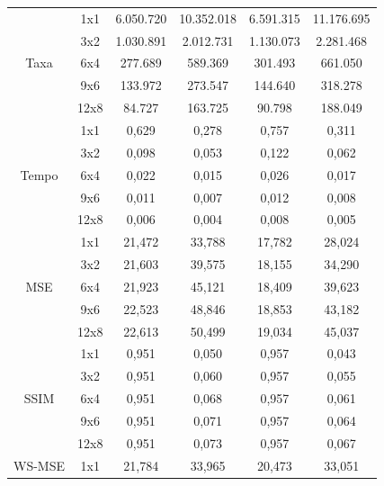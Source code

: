 \begin{longtable}{|c|c|c|c|c|c|}
        \multirow{5}{*}{Taxa}  & 1x1  & 6.050.720 & 10.352.018 & 6.591.315 & 11.176.695 \\ \cline{2-6}
        & 3x2  & 1.030.891 & 2.012.731  & 1.130.073 & 2.281.468 \\ \cline{2-6}
        & 6x4  & 277.689   & 589.369    & 301.493   & 661.050  \\  \cline{2-6}
        & 9x6  & 133.972   & 273.547    & 144.640   & 318.278  \\  \cline{2-6}
        & 12x8 & 84.727    & 163.725    & 90.798    & 188.049  \\   \hline
        \multirow{5}{*}{Tempo} & 1x1  & 0,629     & 0,278      & 0,757     & 0,311     \\  \cline{2-6}
        & 3x2  & 0,098     & 0,053      & 0,122     & 0,062    \\  \cline{2-6}
        & 6x4  & 0,022     & 0,015      & 0,026     & 0,017    \\  \cline{2-6}
        & 9x6  & 0,011     & 0,007      & 0,012     & 0,008    \\  \cline{2-6}
        & 12x8 & 0,006     & 0,004      & 0,008     & 0,005    \\  \hline 
        \multirow{5}{*}{MSE}   & 1x1  & 21,472    & 33,788     & 17,782    & 28,024    \\  \cline{2-6}          
        & 3x2  & 21,603    & 39,575     & 18,155    & 34,290   \\  \cline{2-6}
        & 6x4  & 21,923    & 45,121     & 18,409    & 39,623   \\  \cline{2-6}
        & 9x6  & 22,523    & 48,846     & 18,853    & 43,182   \\  \cline{2-6}
        & 12x8 & 22,613    & 50,499     & 19,034    & 45,037   \\  \hline 
        \multirow{5}{*}{SSIM}  & 1x1  & 0,951     & 0,050      & 0,957     & 0,043     \\  \cline{2-6}
        & 3x2  & 0,951     & 0,060      & 0,957     & 0,055    \\  \cline{2-6}
        & 6x4  & 0,951     & 0,068      & 0,957     & 0,061    \\  \cline{2-6}
        & 9x6  & 0,951     & 0,071      & 0,957     & 0,064    \\  \cline{2-6}
        & 12x8 & 0,951     & 0,073      & 0,957     & 0,067    \\  \hline 
        \multirow{5}{*}{WS-MSE}& 1x1  & 21,784    & 33,965     & 20,473    & 33,051   \\  \cline{2-6}

\end{longtable}

